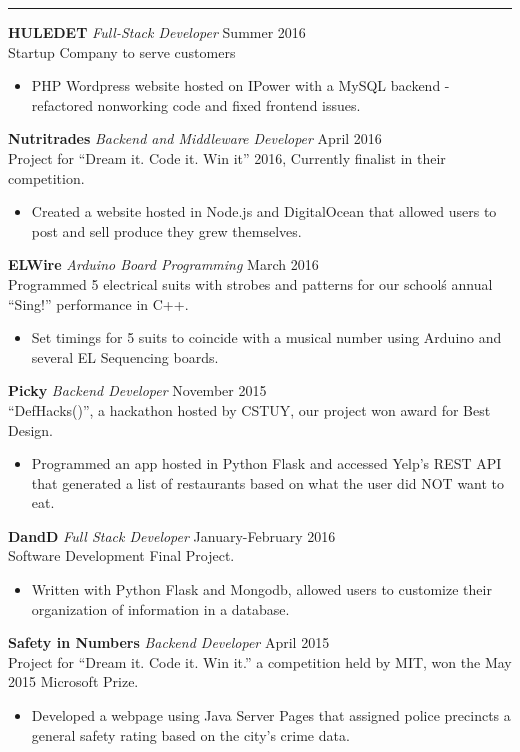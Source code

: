 \documentclass[14]{article}
\begin{document}
  \vspace{0.1cm} \hrule \vspace{0.2cm}
  \noindent\textbf{HULEDET}\textit{ Full-Stack Developer} \hfill Summer 2016\\
  Startup Company to serve customers
  \begin{itemize}[label={--},noitemsep, topsep=0pt]
    \item PHP Wordpress website hosted on IPower with a MySQL backend - refactored nonworking code and fixed frontend issues.
  \end{itemize}
  \noindent\textbf{Nutritrades}\textit{ Backend and Middleware Developer} \hfill April 2016\\
  Project for ``Dream it. Code it. Win it'' 2016, Currently finalist in their competition.
  \begin{itemize}[label={--},noitemsep, topsep=0pt]
    \item Created a website hosted in Node.js and DigitalOcean that allowed users to post and sell produce they grew themselves.
  \end{itemize}
  \textbf{ELWire}\textit{ Arduino Board Programming} \hfill March 2016\\
  Programmed 5 electrical suits with strobes and patterns for our school\'s annual ``Sing!'' performance in C++.
  \begin{itemize}[label={--},noitemsep, topsep=0pt]
    \item Set timings for 5 suits to coincide with a musical number using Arduino and several EL Sequencing boards.
  \end{itemize}
  \textbf{Picky}\textit{ Backend Developer} \hfill November 2015\\ ``DefHacks()'', a hackathon hosted by CSTUY, our project won award for Best Design.
  \begin{itemize}[label={--},noitemsep, topsep=0pt]
    \item Programmed an app hosted in Python Flask and accessed Yelp's REST API that generated a list of restaurants based on what the user did NOT want to eat.
  \end{itemize}
  \textbf{DandD}\textit{ Full Stack Developer} \hfill January-February 2016\\
  Software Development Final Project.
  \begin{itemize}[label={--},noitemsep, topsep=0pt]
    \item Written with Python Flask and Mongodb, allowed users to customize their organization of information in a database.
  \end{itemize}
  \noindent\textbf{Safety in Numbers}\textit{ Backend Developer} \hfill April 2015\\
  Project for ``Dream it. Code it. Win it.'' a competition held by MIT, won the May 2015 Microsoft Prize.
  \begin{itemize}[label={--},noitemsep, topsep=0pt]
    \item Developed a webpage using Java Server Pages that assigned police precincts a general safety rating based on the city's crime data.
  \end{itemize}
\end{document}
